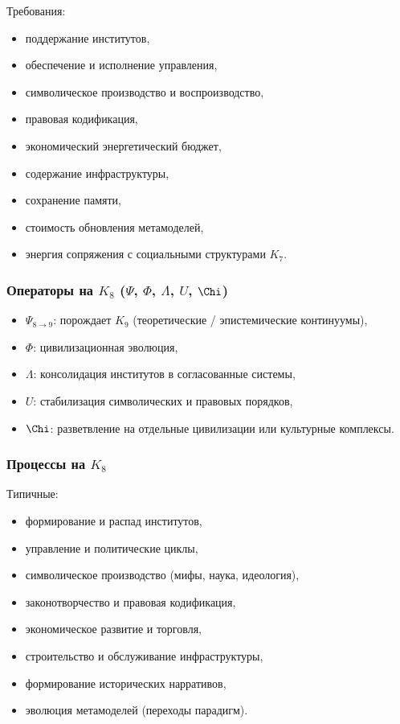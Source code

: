 Требования:
\begin{itemize}
    \item поддержание институтов,
    \item обеспечение и исполнение управления,
    \item символическое производство и воспроизводство,
    \item правовая кодификация,
    \item экономический энергетический бюджет,
    \item содержание инфраструктуры,
    \item сохранение памяти,
    \item стоимость обновления метамоделей,
    \item энергия сопряжения с социальными структурами $K_7$.
\end{itemize}

\subsubsection{Операторы на \texorpdfstring{$K_8$}{K_8} (\texorpdfstring{$\Psi$}{\Psi}, \texorpdfstring{$\Phi$}{\Phi}, \texorpdfstring{$\Lambda$}{\Lambda}, \texorpdfstring{$U$}{U}, \texorpdfstring{$\Chi$}{\Chi})}

\begin{itemize}
    \item $\Psi_{8\to9}$: порождает $K_9$ (теоретические / эпистемические континуумы),
    \item $\Phi$: цивилизационная эволюция,
    \item $\Lambda$: консолидация институтов в согласованные системы,
    \item $U$: стабилизация символических и правовых порядков,
    \item $\Chi$: разветвление на отдельные цивилизации или культурные комплексы.
\end{itemize}

\subsubsection{Процессы на \texorpdfstring{$K_8$}{K_8}}

Типичные:
\begin{itemize}
    \item формирование и распад институтов,
    \item управление и политические циклы,
    \item символическое производство (мифы, наука, идеология),
    \item законотворчество и правовая кодификация,
    \item экономическое развитие и торговля,
    \item строительство и обслуживание инфраструктуры,
    \item формирование исторических нарративов,
    \item эволюция метамоделей (переходы парадигм).
\end{itemize}

